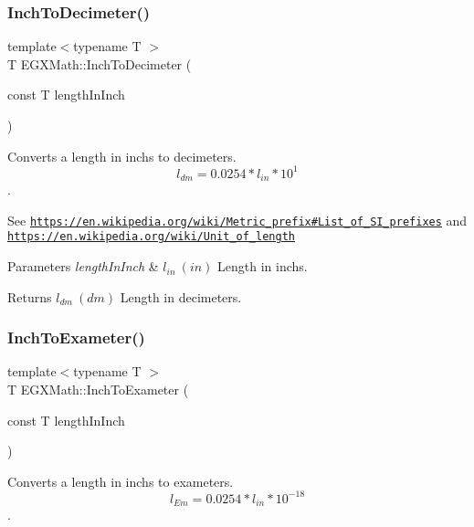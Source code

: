 \subsubsection{\texorpdfstring{Inch\+To\+Decimeter()}{InchToDecimeter()}}
{\footnotesize\ttfamily template$<$typename T $>$ \\
T E\+G\+X\+Math\+::\+Inch\+To\+Decimeter (\begin{DoxyParamCaption}\item[{const T}]{length\+In\+Inch }\end{DoxyParamCaption})}



Converts a length in inchs to decimeters. \[ l_{dm}=0.0254 * l_{in} * 10^{1} \]. 

See \href{https://en.wikipedia.org/wiki/Metric_prefix#List_of_SI_prefixes}{\tt https\+://en.\+wikipedia.\+org/wiki/\+Metric\+\_\+prefix\#\+List\+\_\+of\+\_\+\+S\+I\+\_\+prefixes} and \href{https://en.wikipedia.org/wiki/Unit_of_length}{\tt https\+://en.\+wikipedia.\+org/wiki/\+Unit\+\_\+of\+\_\+length} 
\begin{DoxyParams}{Parameters}
{\em length\+In\+Inch} & $ l_{in}\ (in)$ Length in inchs. \\
\hline
\end{DoxyParams}
\begin{DoxyReturn}{Returns}
$ l_{dm}\ (dm)$ Length in decimeters. 
\end{DoxyReturn}
\mbox{\label{group___e_g_x_math-_conversions-_length_conversions-_imperial-_inch-_s_i_ga408aa62c2ee50f560f7ffe178ab0f1de}} 
\subsubsection{\texorpdfstring{Inch\+To\+Exameter()}{InchToExameter()}}
{\footnotesize\ttfamily template$<$typename T $>$ \\
T E\+G\+X\+Math\+::\+Inch\+To\+Exameter (\begin{DoxyParamCaption}\item[{const T}]{length\+In\+Inch }\end{DoxyParamCaption})}



Converts a length in inchs to exameters. \[ l_{Em}=0.0254 * l_{in} * 10^{-18} \]. 

